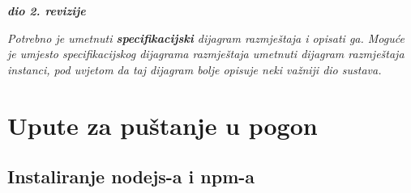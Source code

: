 			\textbf{\textit{dio 2. revizije}}
			
			 \textit{Potrebno je umetnuti \textbf{specifikacijski} dijagram razmještaja i opisati ga. Moguće je umjesto specifikacijskog dijagrama razmještaja umetnuti dijagram razmještaja instanci, pod uvjetom da taj dijagram bolje opisuje neki važniji dio sustava.}
			
			\eject 
		
		\section{Upute za puštanje u pogon}
		
		\subsection*{Instaliranje nodejs-a i npm-a}
